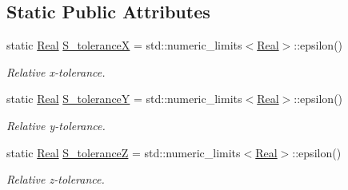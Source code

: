 \subsection*{Static Public Attributes}
\begin{DoxyCompactItemize}
\item 
static \hyperlink{namespaceFVCode3D_a40c1f5588a248569d80aa5f867080e83}{Real} \hyperlink{classFVCode3D_1_1Point3D_a970c57d27a188366fb4a30fd08b98b7a}{S\+\_\+toleranceX} = std\+::numeric\+\_\+limits$<$\hyperlink{namespaceFVCode3D_a40c1f5588a248569d80aa5f867080e83}{Real}$>$\+::epsilon()
\begin{DoxyCompactList}\small\item\em Relative x-\/tolerance. \end{DoxyCompactList}\item 
static \hyperlink{namespaceFVCode3D_a40c1f5588a248569d80aa5f867080e83}{Real} \hyperlink{classFVCode3D_1_1Point3D_a1ec72cecf8486e2a9433093ac3b0cc2c}{S\+\_\+toleranceY} = std\+::numeric\+\_\+limits$<$\hyperlink{namespaceFVCode3D_a40c1f5588a248569d80aa5f867080e83}{Real}$>$\+::epsilon()
\begin{DoxyCompactList}\small\item\em Relative y-\/tolerance. \end{DoxyCompactList}\item 
static \hyperlink{namespaceFVCode3D_a40c1f5588a248569d80aa5f867080e83}{Real} \hyperlink{classFVCode3D_1_1Point3D_a180a0f561aae1274ee37b0ce334db956}{S\+\_\+toleranceZ} = std\+::numeric\+\_\+limits$<$\hyperlink{namespaceFVCode3D_a40c1f5588a248569d80aa5f867080e83}{Real}$>$\+::epsilon()
\begin{DoxyCompactList}\small\item\em Relative z-\/tolerance. \end{DoxyCompactList}\end{DoxyCompactItemize}
